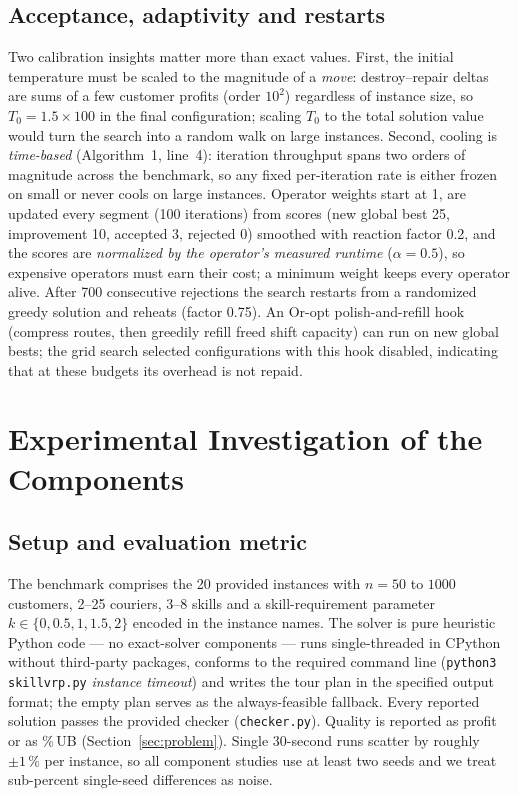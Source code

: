 \documentclass[10pt, a4paper]{article}
\newcommand{\ub}{\%\,UB}
\begin{document}
\subsection{Acceptance, adaptivity and restarts}\label{sec:accept}
Two calibration insights matter more than exact values. First, the initial
temperature must be scaled to the magnitude of a \emph{move}:
destroy--repair deltas are sums of a few customer profits (order $10^2$)
regardless of instance size, so $T_0 = 1.5 \times 100$ in the final
configuration; scaling $T_0$ to the total solution value would turn the
search into a random walk on large instances. Second, cooling is
\emph{time-based} (Algorithm~1, line~4): iteration throughput spans two
orders of magnitude across the benchmark, so any fixed per-iteration rate
is either frozen on small or never cools on large instances. Operator
weights start at 1, are updated every segment (100 iterations) from scores
(new global best 25, improvement 10, accepted 3, rejected 0) smoothed with
reaction factor 0.2, and the scores are \emph{normalized by the operator's
measured runtime} ($\alpha=0.5$), so expensive operators must earn their
cost; a minimum weight keeps every operator alive. After 700 consecutive
rejections the search restarts from a randomized greedy solution and
reheats (factor 0.75). An Or-opt polish-and-refill hook (compress routes,
then greedily refill freed shift capacity) can run on new global bests; the
grid search selected configurations with this hook disabled, indicating
that at these budgets its overhead is not repaid.

\section{Experimental Investigation of the Components}\label{sec:components}

\subsection{Setup and evaluation metric}
The benchmark comprises the 20 provided instances with $n=50$ to $1000$
customers, 2--25 couriers, 3--8 skills and a skill-requirement parameter
$k\in\{0,0.5,1,1.5,2\}$ encoded in the instance names. The solver is pure
heuristic Python code --- no exact-solver components --- runs single-threaded
in CPython without third-party packages, conforms to the required command
line (\texttt{python3 skillvrp.py} \emph{instance timeout}) and writes the
tour plan in the specified output format; the empty plan serves as the
always-feasible fallback. Every reported solution passes the provided
checker (\texttt{checker.py}). Quality is reported as profit or as \ub{}
(Section~\ref{sec:problem}). Single 30-second runs scatter by roughly
$\pm 1\,\%$ per instance, so all component studies use at least two seeds
and we treat sub-percent single-seed differences as noise.
\end{document}
